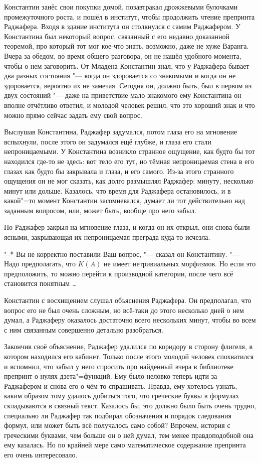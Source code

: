 Константин занёс свои покупки домой, позавтракал дрожжевыми булочками
промежуточного роста, и пошёл в институт, чтобы продолжить чтение препринта
Раджафера.
Входя в здание института он столкнулся с самим Раджафером.
У Константина был некоторый вопрос, связанный с его недавно доказанной теоремой,
про который тот мог кое-что знать, возможно, даже не хуже Варанга.
Вчера за обедом, во время общего разговора, он не нашёл удобного момента, чтобы
о нем заговорить.
От Младена Константин знал, что у Раджафера бывает два разных состояния "---
когда он здоровается со знакомыми и когда он не здоровается, вероятно их не
замечая.
Сегодня он, должно быть, был в первом из двух состояний "--- даже на приветствие
мало знакомого ему Константина он вполне отчётливо ответил, и молодой человек
решил, что это хороший знак и что можно прямо сейчас задать ему свой вопрос.

Выслушав Константина, Раджафер задумался, потом глаза его на мгновение
вспыхнули, после этого он задумался ещё глубже, и глаза его стали
непроницаемыми.
У Константина возникло странное ощущение, как будто бы тот находился где-то не
здесь: вот тело его тут, но тёмная непроницаемая стена в его глазах как будто бы
закрывала и глаза, и его самого.
Из-за этого странного ощущения он не мог сказать, как долго размышлял Раджафер:
минуту, несколько минут или дольше.
Казалось, что время для Раджафера остановилось, и в какой"=то момент Константин
засомневался, думает ли тот действительно над заданным вопросом, или, может
быть, вообще про него забыл.

Но Раджафер закрыл на мгновение глаза, и когда он их открыл, они снова были
ясными, закрывающая их непроницаемая преграда куда-то исчезла.

"--* Вы не корректно поставили Ваш вопрос, "--- сказал он Константину.
"--- Надо предполагать, что $K(A)$ не имеет нетривиальных морфизмов.
Но если это предположить, то можно перейти к производной категории, после чего
всё становится понятным \ldots

Константин с восхищением слушал объяснения Раджафера.
Он предполагал, что вопрос его не был очень сложным, но всё-таки до этого
несколько дней о нем думал, а Раджаферу оказалось достаточно всего нескольких
минут, чтобы во всем с ним связанным совершенно детально разобраться.

Закончив своё объяснение, Раджафер удалился по коридору в сторону флигеля, в
котором находился его кабинет.
Только после этого молодой человек спохватился и вспомнил, что забыл у него
спросить про найденный вчера в библиотеке препринт о нулях дзета"=функций.
Ему было неловко теперь идти за Раджафером и снова его о чём-то спрашивать.
Правда, ему хотелось узнать, каким образом тому удалось добиться того, что
греческие буквы в формулах складываются в связный текст.
Казалось бы, это должно было быть очень трудно, специально ли Раджафер так
подбирал обозначения и порядок следования формул, или может быть всё получалось
само собой?
Впрочем, история с греческими буквами, чем больше он о ней думал, тем менее
правдоподобной она ему казалась.
Но по крайней мере само математическое содержание препринта его очень
интересовало.

